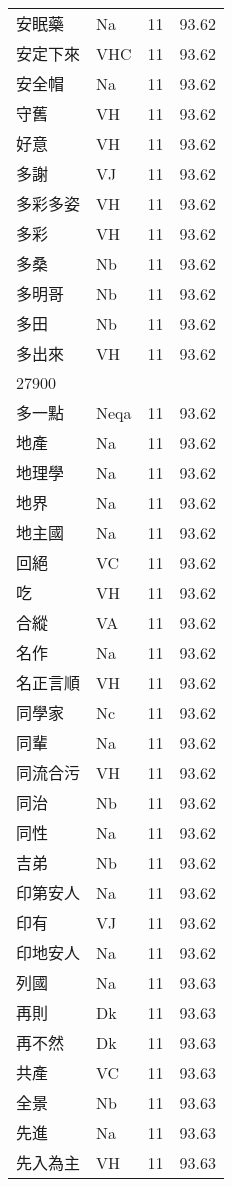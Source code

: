 \documentclass[twocolumn]{book}
\begin{document}
\begin{supertabular}{llrr}
安眠藥 & Na & 11 &  93.62\\
安定下來 & VHC & 11 &  93.62\\
安全帽 & Na & 11 &  93.62\\
守舊 & VH & 11 &  93.62\\
好意 & VH & 11 &  93.62\\
多謝 & VJ & 11 &  93.62\\
多彩多姿 & VH & 11 &  93.62\\
多彩 & VH & 11 &  93.62\\
多桑 & Nb & 11 &  93.62\\
多明哥 & Nb & 11 &  93.62\\
多田 & Nb & 11 &  93.62\\
多出來 & VH & 11 &  93.62\\
27900\\
多一點 & Neqa & 11 &  93.62\\
地產 & Na & 11 &  93.62\\
地理學 & Na & 11 &  93.62\\
地界 & Na & 11 &  93.62\\
地主國 & Na & 11 &  93.62\\
回絕 & VC & 11 &  93.62\\
吃 & VH & 11 &  93.62\\
合縱 & VA & 11 &  93.62\\
名作 & Na & 11 &  93.62\\
名正言順 & VH & 11 &  93.62\\
同學家 & Nc & 11 &  93.62\\
同輩 & Na & 11 &  93.62\\
同流合污 & VH & 11 &  93.62\\
同治 & Nb & 11 &  93.62\\
同性 & Na & 11 &  93.62\\
吉弟 & Nb & 11 &  93.62\\
印第安人 & Na & 11 &  93.62\\
印有 & VJ & 11 &  93.62\\
印地安人 & Na & 11 &  93.62\\
列國 & Na & 11 &  93.63\\
再則 & Dk & 11 &  93.63\\
再不然 & Dk & 11 &  93.63\\
共產 & VC & 11 &  93.63\\
全景 & Nb & 11 &  93.63\\
先進 & Na & 11 &  93.63\\
先入為主 & VH & 11 &  93.63\\

\end{supertabular}
\end{document}
